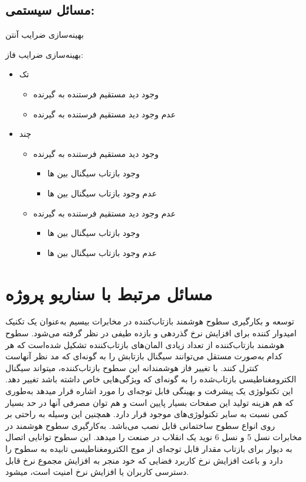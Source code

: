 \subsection{مسائل سیستمی:}
\begin{itemize}
	\item 
	بهینه‌سازی ضرایب آنتن
	
	{
	\item 
	بهینه‌سازی ضرایب فاز:
	\begin{itemize}
	\item 
	تک 
	\begin{itemize}
		\item 
		وجود دید مستقیم فرستنده به گیرنده
		\item 
		عدم وجود دید مستقیم فرستنده به گیرنده
	\end{itemize}
	\item 
	چند 
	\begin{itemize}
			\item 
			وجود دید مستقیم فرستنده به گیرنده
			\begin{itemize}
				\item 
				وجود بازتاب سیگنال بین  ها
				\item 
				عدم وجود بازتاب سیگنال بین  ها
			\end{itemize}
			\item 
			عدم وجود دید مستقیم فرستنده به گیرنده
			\begin{itemize}
				\item 
				وجود بازتاب سیگنال بین  ها
				\item 
				عدم وجود بازتاب سیگنال بین  ها
			\end{itemize}
	\end{itemize}
	\end{itemize}
	}

\end{itemize}
\newpage
\section{مسائل مرتبط با سناریو پروژه}

توسعه و بکارگیری سطوح هوشمند بازتاب‌کننده در مخابرات بیسیم به‌عنوان یک تکنیک امیدوار کننده برای افزایش نرخ گذردهی و بازده طیفی در نظر گرفته می‌شود.
سطوح هوشمند بازتاب‌کننده از تعداد زیادی المان‌های بازتاب‌کننده تشکیل شده‌است که هر کدام به‌صورت مستقل می‌توانند سیگنال بازتابش را به گونه‌ای که مد نظر آنهاست کنترل کنند. با تغییر فاز هوشمندانه این سطوح بازتاب‌کننده،  میتواند سیگنال الکترومغناطیسی بازتاب‌شده را به گونه‌ای که ویژگی‌هایی خاص داشته باشد تغییر دهد. این تکنولوژی یک پیشرفت و بهینگی فابل توجه‌ای را مورد اشاره قرار میدهد به‌طوری که هم هزینه تولید این صفحات بسیار پایین است و هم توان مصرفی آنها در حد بسیار کمی نسبت به سایر تکنولوژی‌های موجود قرار دارد. همچنین این وسیله به راحتی بر روی انواع سطوح ساختمانی قابل نصب می‌باشد. به‌کارگیری سطوح هوشمند در مخابرات نسل 5 و نسل 6 نوید یک انقلاب در صنعت را میدهد. این سطوح توانایی اتصال به دیوار برای بازتاب مقدار قابل توجه‌ای از موج الکترومغناطیسی تابیده به سطوح را دارد و باعث افزایش نرخ کاربرد فضایی که خود منجر به افزایش مجموع نرخ قابل دسترسی کاربران یا افزایش نرخ امنیت است، میشود.

